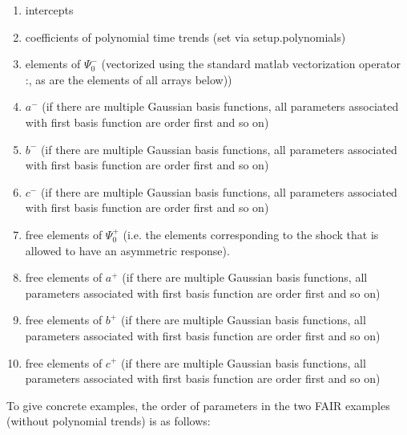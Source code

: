 \documentclass[a4paper,12pt]{article}
\begin{document}
\begin{enumerate}
  \item intercepts
  \item coefficients of polynomial time trends (set via setup.polynomials)
  \item elements of $\Psi_0^-$ (vectorized using the standard matlab vectorization operator :, as are the elements of all arrays below))
  \item $a^-$ (if there are multiple Gaussian basis functions, all parameters associated with first basis function are order first and so on)
  \item $b^-$ (if there are multiple Gaussian basis functions, all parameters associated with first basis function are order first and so on)
  \item $c^-$ (if there are multiple Gaussian basis functions, all parameters associated with first basis function are order first and so on)
  \item free elements of $\Psi_0^+$ (i.e. the elements corresponding to the shock that is allowed to have an asymmetric response).
  \item free elements of $a^+$ (if there are multiple Gaussian basis functions, all parameters associated with first basis function are order first and so on)
  \item free elements of $b^+$ (if there are multiple Gaussian basis functions, all parameters associated with first basis function are order first and so on)
  \item free elements of $c^+$ (if there are multiple Gaussian basis functions, all parameters associated with first basis function are order first and so on)
\end{enumerate}


To give concrete examples, the order of parameters in the two FAIR examples
(without polynomial trends) is as follows:
\end{document}
